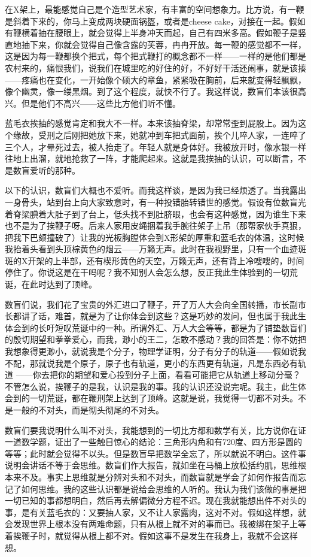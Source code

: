 在X架上，最能感觉自己是个造型艺术家，有丰富的空间想象力。比方说，有一鞭是斜着下来的，你马上变成两块硬面锅盔，或者是cheese cake，对接在一起。假如有鞭横着抽在腰眼上，就会觉得上半身冲天而起，自己有四米多高。假如鞭子是竖直地抽下来，你就会觉得自己像含露的芙蓉，冉冉开放。每一鞭的感觉都不一样，这是因为每一鞭都换个把式，每个把式鞭打的概念都不一样——一样的是他们都是农村来的，痛恨我们，说我们在城里吃的好住的好，不好好干活还闹事，就是该揍——疼痛也在变化，一开始像个硕大的章鱼，紧紧吸在胸前，后来就变得轻飘飘，像个幽灵，像一缕黑烟。到了这个程度，就快不行了。我这样说，数盲们本该很高兴。但是他们不高兴——这些比方他们听不懂。 

蓝毛衣挨抽的感觉肯定和我大不一样。本来该抽脊梁，却常常歪到屁股上。因为这个缘故，受刑之后刚把她放下来，她就冲到车把式面前，挨个儿啐人家，一连啐了三个人，才晕死过去，被人抬走了。年轻人就是身体好。我被放开时，像水银一样往地上出溜，就地抢救了一阵，才能爬起来。这就是我挨抽的认识，可以断言，不是数盲爱听的那种。 

以下的认识，数盲们大概也不爱听。而我这样谈，是因为我已经烦透了。当我露出一身骨头，站到台上向大家致意时，有一种投错胎转错世的感觉。假设有位数盲光着脊梁腆着大肚子到了台上，低头找不到肚脐眼，也会有这种感觉，因为谁生下来也不是为了挨鞭子呀。后来人家用皮绳捆着我手腕往架子上吊（那帮家伙手真狠，把我下巴颏撞破了）让我的光板胸膛体会到X形架的厚重和蓝毛衣的体温，这时候我抬着头看到头顶棕黄色的烟云——万籁无声。此时在我视野里，只有一个血迹斑斑的X开架的上半部，还有楔形黄色的天空，万籁无声，还有背上冷嗖嗖的，时间停住了。你说这是在干吗呢？我不知别人会怎么想，反正我此生体验到的一切荒诞，在此时达到了顶峰。 

数盲们说，我们花了宝贵的外汇进口了鞭子，开了万人大会向全国转播，市长副市长都讲了话，难首，就是为了让你体会到这些？这是巧妙的发问，但也属于我此生体会到的长吁短叹荒诞中的一种。所谓外汇、万人大会等等，都是为了铺垫数盲们的殷切期望和拳拳爱心，而我，渺小的王二，怎敢不感动？我的回答是：你不妨把我想象得更渺小，就说我是个分子，物理学证明，分子有分子的轨道——假如说我不配，那就说我是个原子，原子也有轨道，更小的东西更有轨道，凡是东西必有轨道 ——你去把你的期望和爱心投到分子上面，看看可能把它从轨道上移动分毫？不管怎么说，挨鞭子的是我，认识是我的事。我的认识还没说完呢。我主，此生体会到的一切荒诞，都在鞭刑架上达到了顶峰。这就是说，我觉得一切都不对头。不是一般的不对头，而是彻头彻尾的不对头。 

数盲们要我说明什么叫不对头，我能想到的一切比方都和数学有关，比方说你在证一道数学题，证出了一些触目惊心的结论：三角形内角和有720度、四方形是圆的等等；此时就会觉得不以头。但是数盲早把数学全忘了，所以就说不明白。这件事说明会讲话不等于会思维。数盲们作大报告，就如坐在马桶上放松括约肌，思维根本来不及。事实上思维就是分辨对头和不对头，而数盲就是学会了如何作报告而忘记了如何思维。我的这些认识都是说给会思维的人听的。我认为我们该做的事是把一切已知的事都想明白，然后再去解偏微分方程不迟。现在我就能想出件不对头的事，是有关蓝毛衣的：又要抽人家，又不让人家露肉，这对不对。假如这样想，就会发现世界上根本没有两难命题，只有从根上就不对的事而已。我被绑在架子上等着挨鞭子时，就觉得从根上都不对。假如这事不是发生在我身上，我就不会这样想。 



